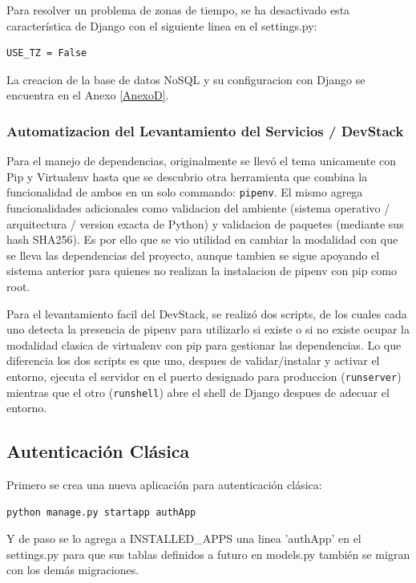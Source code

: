 Para resolver un problema de zonas de tiempo, se ha desactivado esta característica de Django con el siguiente linea en el settings.py:
\lstset{language=Python}
\begin{lstlisting}
USE_TZ = False
\end{lstlisting}
\lstset{language=Bash}

La creacion de la base de datos NoSQL y su configuracion con Django se encuentra en el Anexo \ref{AnexoD}.

\subsubsection{Automatizacion del Levantamiento del Servicios / DevStack}
Para el manejo de dependencias, originalmente se llevó el tema unicamente con Pip y Virtualenv hasta que se descubrio otra herramienta que combina la funcionalidad de ambos en un solo commando: \texttt{pipenv}. El mismo agrega funcionalidades adicionales como validacion del ambiente (sistema operativo / arquitectura / version exacta de Python) y validacion de paquetes (mediante sus hash SHA256). Es por ello que se vio utilidad en cambiar la modalidad con que se lleva las dependencias del proyecto, aunque tambien se sigue apoyando el sistema anterior para quienes no realizan la instalacion de pipenv con pip como root.

Para el levantamiento facil del DevStack, se realizó dos scripts, de los cuales cada uno detecta la presencia de pipenv para utilizarlo si existe o si no existe ocupar la modalidad clasica de virtualenv con pip para gestionar las dependencias. Lo que diferencia los dos scripts es que uno, despues de validar/instalar y activar el entorno, ejecuta el servidor en el puerto designado para produccion (\texttt{runserver}) mientras que el otro (\texttt{runshell}) abre el shell de Django despues de adecuar el entorno.

\subsection{Autenticación Clásica}

Primero se crea una nueva aplicación para autenticación clásica:
\begin{lstlisting}
python manage.py startapp authApp
\end{lstlisting}

Y de paso se lo agrega a INSTALLED\_APPS una linea 'authApp' en el settings.py para que sus tablas definidos a futuro en models.py también se migran con los demás migraciones.

